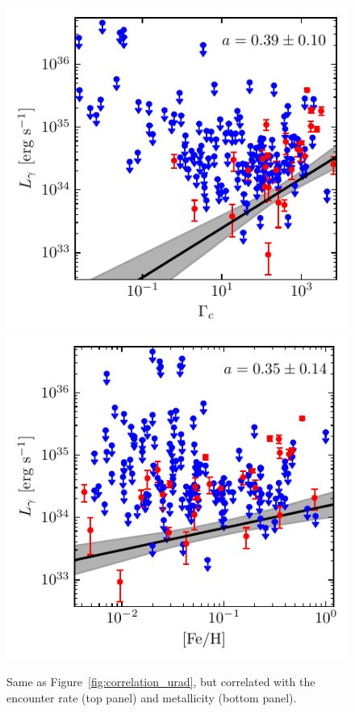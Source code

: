 \documentclass[doublespace,nopageskip]{VTthesis} %
\begin{document}
\begin{figure}
    \centering
    \includegraphics[width=\columnwidth]{Figures/Globular/correlation/L_gamma_vs_encounter_rate.pdf}
    \includegraphics[width=\columnwidth]{Figures/Globular/correlation/L_gamma_vs_metallicity.pdf}
    \caption{\label{fig:correlation_other} Same as Figure~\ref{fig:correlation_urad}, but correlated with the encounter rate (top panel) and metallicity (bottom panel).}
\end{figure}
\end{document}
